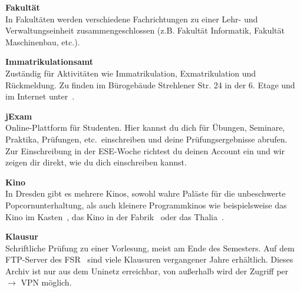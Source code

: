 \begin{multicols}{2}
\textbf{Fakultät} \\
In Fakultäten werden verschiedene Fachrichtungen zu einer Lehr- und Verwaltungseinheit zusammengeschlossen (z.B. Fakultät Informatik, Fakultät Maschinenbau, etc.).



\textbf{Immatrikulationsamt} \\
Zuständig für Aktivitäten wie Immatrikulation, Exmatrikulation und Rückmeldung.
Zu finden im Bürogebäude Strehlener Str. 24 in der 6. Etage und im Internet unter~.



\textbf{jExam} \\
Online-Plattform für Studenten.
Hier kannst du dich für Übungen, Seminare, Praktika, Prüfungen, etc.\ einschreiben und deine Prüfungsergebnisse abrufen.
Zur Einschreibung in der ESE-Woche richtest du deinen Account ein und wir zeigen dir direkt, wie du dich einschreiben kannst.~

\textbf{Kino} \\
In Dresden gibt es mehrere Kinos, sowohl wahre Paläste für die unbeschwerte Popcornunterhaltung, als auch kleinere Programmkinos wie beispielsweise das Kino im Kasten~, das Kino in der Fabrik~ oder das Thalia~.

\textbf{Klausur} \\
Schriftliche Prüfung zu einer Vorlesung, meist am Ende des Semesters.
Auf dem FTP-Server des FSR~ sind viele Klausuren vergangener Jahre erhältlich. Dieses Archiv ist nur aus dem Uninetz erreichbar, von außerhalb wird der Zugriff per $\rightarrow$ VPN möglich.


\end{multicols}

